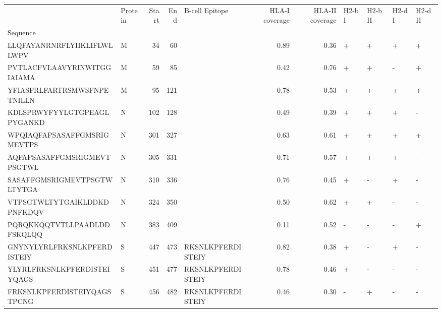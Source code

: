 \begin{tabular}{llrrlrrllll}
\toprule
{} & Protein &  Start &   End &     B-cell Epitope &  HLA-I coverage &  HLA-II coverage & H2-b I & H2-b II & H2-d I & H2-d II \\
Sequence                    &         &        &       &                    &                 &                  &        &         &        &         \\
\midrule
LLQFAYANRNRFLYIIKLIFLWLLWPV &       M &     34 &    60 &                    &            0.89 &             0.36 &      + &       + &      + &       + \\
PVTLACFVLAAVYRINWITGGIAIAMA &       M &     59 &    85 &                    &            0.42 &             0.76 &      + &       + &      - &       + \\
YFIASFRLFARTRSMWSFNPETNILLN &       M &     95 &   121 &                    &            0.78 &             0.53 &      + &       + &      + &       + \\
KDLSPRWYFYYLGTGPEAGLPYGANKD &       N &    102 &   128 &                    &            0.49 &             0.39 &      + &       + &      + &       - \\
WPQIAQFAPSASAFFGMSRIGMEVTPS &       N &    301 &   327 &                    &            0.63 &             0.61 &      + &       + &      + &       + \\
AQFAPSASAFFGMSRIGMEVTPSGTWL &       N &    305 &   331 &                    &            0.71 &             0.57 &      + &       + &      + &       - \\
SASAFFGMSRIGMEVTPSGTWLTYTGA &       N &    310 &   336 &                    &            0.76 &             0.45 &      + &       - &      + &       - \\
VTPSGTWLTYTGAIKLDDKDPNFKDQV &       N &    324 &   350 &                    &            0.50 &             0.62 &      + &       + &      - &       - \\
PQRQKKQQTVTLLPAADLDDFSKQLQQ &       N &    383 &   409 &                    &            0.11 &             0.52 &      - &       - &      - &       + \\
GNYNYLYRLFRKSNLKPFERDISTEIY &       S &    447 &   473 &  RKSNLKPFERDISTEIY &            0.82 &             0.38 &      + &       - &      + &       - \\
YLYRLFRKSNLKPFERDISTEIYQAGS &       S &    451 &   477 &  RKSNLKPFERDISTEIY &            0.78 &             0.46 &      + &       - &      - &       - \\
FRKSNLKPFERDISTEIYQAGSTPCNG &       S &    456 &   482 &  RKSNLKPFERDISTEIY &            0.46 &             0.30 &      - &       + &      - &       - \\

\end{tabular}
